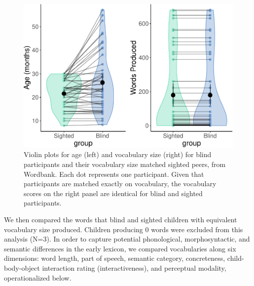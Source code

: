\documentclass[
  man,floatsintext]{apa6}
\begin{document}
\begin{figure}
\centering
\includegraphics{VI_CDI_manuscript_files/figure-latex/vocab-match-demo-1.pdf}
\caption{\label{fig:vocab-match-demo}Violin plots for age (left) and vocabulary size (right) for blind participants and their vocabulary size matched sighted peers, from Wordbank. Each dot represents one participant. Given that participants are matched exactly on vocabulary, the vocabulary scores on the right panel are identical for blind and sighted participants.}
\end{figure}

We then compared the words that blind and sighted children with equivalent vocabulary size produced. Children producing 0 words were excluded from this analysis (N=3). In order to capture potential phonological, morphosyntactic, and semantic differences in the early lexicon, we compared vocabularies along six dimensions: word length, part of speech, semantic category, concreteness, child-body-object interaction rating (interactiveness), and perceptual modality, operationalized below.
\end{document}
